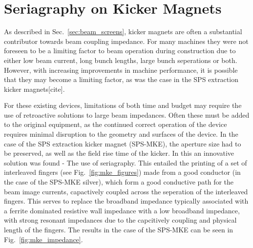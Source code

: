 \section{Seriagraphy on Kicker Magnets}
\label{sec:seriagraphy}

As described in Sec.~\ref{sec:beam_screens}, kicker magnets are often a substantial contributor towards beam coupling impedance. For many machines they were not foreseen to be a limiting factor to beam operation during construction due to either low beam current, long bunch lengths, large bunch seperations or both. However, with increasing improvements in machine performance, it is possible that they may become a limiting factor, as was the case in the SPS extraction kicker magnets[cite]. 

For these existing devices, limitations of both time and budget may require the use of retroactive solutions to large beam impedances. Often these must be added to the original equipment, as the continued correct operation of the device requires minimal disruption to the geometry and surfaces of the device. In the case of the SPS extraction kicker magnet (SPS-MKE), the aperture size had to be preserved, as well as the field rise time of the kicker. In this an innovative solution was found - The use of seriagraphy. This entailed the printing of a set of interleaved fingers (see Fig.~\ref{fig:mke_figures}) made from a good conductor (in the case of the SPS-MKE silver), which form a good conductive path for the beam image currents, capactively coupled across the seperation of the interleaved fingers. This serves to replace the broadband impedance typically associated with a ferrite dominated resistive wall impedance with a low broadband impedance, with strong resonant impedances due to the capcitively coupling and physical length of the fingers. The results in the case of the SPS-MKE can be seen in Fig.~\ref{fig:mke_impedance}.


